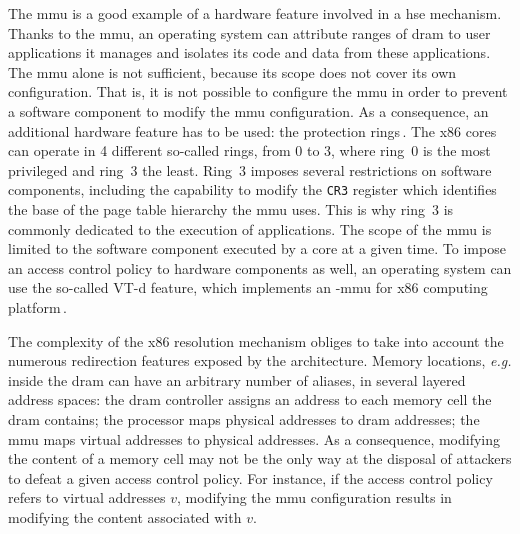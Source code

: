 The \ac{mmu} is a good example of a hardware feature involved in a \ac{hse}
mechanism.
%
Thanks to the \ac{mmu}, an operating system can attribute ranges of \ac{dram} to
user applications it manages and isolates its code and data from these
applications.
%
The \ac{mmu} alone is not sufficient, because its scope does not cover its own
configuration.
%
That is, it is not possible to configure the \ac{mmu} in order to prevent a
software component to modify the \ac{mmu} configuration.
%
As a consequence, an additional hardware feature has to be used: the protection
rings\,\cite[Volume 3, Section 5.5]{intel2014manual}.
%
The x86 cores can operate in 4 different so-called rings, from 0 to 3, where
ring~0 is the most privileged and ring~3 the least.
%
Ring~3 imposes several restrictions on software components, including the
capability to modify the \texttt{CR3} register which identifies the base of the
page table hierarchy the \ac{mmu} uses.
%
This is why ring~3 is commonly dedicated to the execution of applications.
%
The scope of the \ac{mmu} is limited to the software component executed
by a core at a given time.
%
To impose an access control policy to hardware components as well, an operating
system can use the so-called VT-d feature, which implements an \IO-\ac{mmu} for
x86 computing platform\,\cite{abramson2006vtd}.

%
%

The complexity of the x86 \IO resolution mechanism obliges to take into account
the numerous redirection features exposed by the architecture.
%
Memory locations, \emph{e.g.} inside the \ac{dram} can have an arbitrary number
of aliases, in several layered address spaces: the \ac{dram} controller assigns
an address to each memory cell the \ac{dram} contains; the processor maps
physical addresses to \ac{dram} addresses; the \ac{mmu} maps virtual addresses
to physical addresses.
%
As a consequence, modifying the content of a memory cell may not be the only way
at the disposal of attackers to defeat a given access control policy.
%
For instance, if the access control policy refers to virtual addresses \( v \),
modifying the \ac{mmu} configuration results in modifying the content associated
with \( v \).

